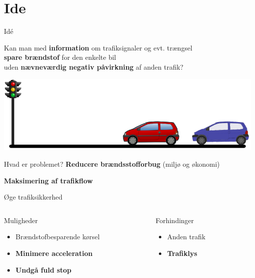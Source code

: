 \section{Ide}

\begin{frame}{Idé}%
\begin{center}
Kan man med \textbf{information} om trafiksignaler og evt. trængsel\\\textbf{spare brændstof} for den enkelte bil\\uden \textbf{nævneværdig negativ påvirkning} af anden trafik?
\end{center}
\includegraphics[width=1\textwidth]{../images/idea.png}
\end{frame}

\begin{frame}{Hvad er problemet?}
\textbf{Reducere brændsstofforbug} (miljø og økonomi)

\textbf{Maksimering af trafikflow}

Øge trafiksikkerhed

\vspace{5mm}
\begin{columns}
\begin{column}{0.5\textwidth}
Muligheder
\begin{itemize}
\item Brændstofbesparende kørsel
\item \textbf{Minimere acceleration}
\item \textbf{Undgå fuld stop}
\end{itemize}

\end{column}
\begin{column}{0.4\textwidth}
Forhindinger
\begin{itemize}
\item Anden trafik
\item \textbf{Trafiklys}
\end{itemize}
\end{column}
\end{columns}
\end{frame}


